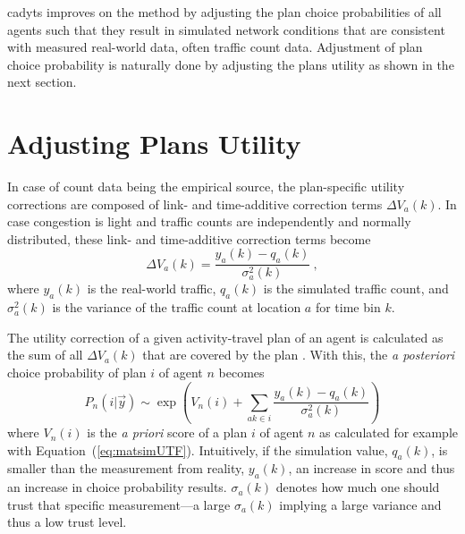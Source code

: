 \gls{cadyts} improves on the method by adjusting the plan choice probabilities of all agents such that they result in simulated network conditions that are consistent with measured real-world data, often traffic count data. Adjustment of plan choice probability is naturally done by adjusting the plans utility as shown in the next section.

\section{Adjusting Plans Utility}
In case of count data being the empirical source, the plan-specific utility corrections are composed of link- and time-additive correction terms $\Delta V_a(k)$. 
In case congestion is light and traffic counts are independently and normally distributed, these link- and time-additive correction terms become \cite[p.487]{FloetteroedChenEtAl2011BehavioralCalibAndAnaNETS}
%
\begin{equation}
\Delta V_a(k) = \frac{y_a(k) - q_a(k)} {\sigma_a^2(k)} \ ,
\label{eq:cadyts:correction}
\end{equation}
%
where $y_a(k)$ is the real-world traffic, $q_a(k)$ is the simulated traffic count, and $\sigma^2_a(k)$ is the variance of the traffic count at location $a$ for time bin $k$.
%

The utility correction of a given activity-travel plan of an agent is calculated as the sum of all $\Delta V_a(k)$ that are covered by the plan \citep{FloetteroedChenEtAl2011BehavioralCalibAndAnaNETS}. 
With this, the \textit{a posteriori} choice probability of plan $i$ of agent $n$ becomes
%
\begin{equation}
P_n(i|\vec{y}) \sim \exp\left(V_n(i)+ \sum_{ak\in_{}i}   \frac{y_a(k)-q_a(k)}{\sigma^2_a(k)} \right)	
\label{eq:cadyts:selection}
\end{equation}
where $V_n(i)$ is the \textit{a priori} score of a plan $i$ of agent $n$ as calculated for example with Equation~(\ref{eq:matsimUTF}).
%
Intuitively, if the simulation value, $q_a(k)$, is smaller than the measurement from reality, $y_a(k)$, an increase in score and thus an increase in choice probability results. 
$\sigma_a(k)$ denotes how much one should trust that specific measurement---a large $\sigma_a(k)$ implying a large variance and thus a low trust level.

